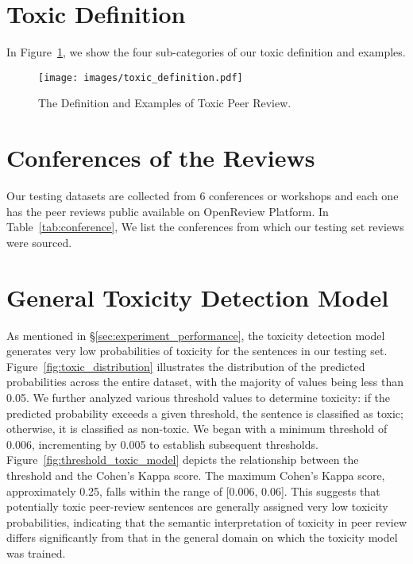 \appendix



\section{Toxic Definition}

In Figure~\ref{fig:toxic_definition}, we show the four sub-categories of our toxic definition and examples. 

\begin{figure}[h]
    \centering
    \texttt{[image: images/toxic\_definition.pdf]}
    \caption{The Definition and Examples of Toxic Peer Review. }
    \label{fig:toxic_definition}
\end{figure}

\section{Conferences of the Reviews}

Our testing datasets are collected from 6 conferences or workshops and each one has the peer reviews public available on OpenReview Platform. 
In Table~\ref{tab:conference}, We list the conferences from which our testing set reviews were sourced.






\section{General Toxicity Detection Model}

As mentioned in \S\ref{sec:experiment_performance}, the toxicity detection model generates very low probabilities of toxicity for the sentences in our testing set. Figure~\ref{fig:toxic_distribution} illustrates the distribution of the predicted probabilities across the entire dataset, with the majority of values being less than 0.05. We further analyzed various threshold values to determine toxicity: if the predicted probability exceeds a given threshold, the sentence is classified as toxic; otherwise, it is classified as non-toxic. We began with a minimum threshold of 0.006, incrementing by 0.005 to establish subsequent thresholds. Figure~\ref{fig:threshold_toxic_model} depicts the relationship between the threshold and the Cohen's Kappa score. The maximum Cohen's Kappa score, approximately 0.25, falls within the range of [0.006, 0.06]. This suggests that potentially toxic peer-review sentences are generally assigned very low toxicity probabilities, indicating that the semantic interpretation of toxicity in peer review differs significantly from that in the general domain on which the toxicity model was trained.



